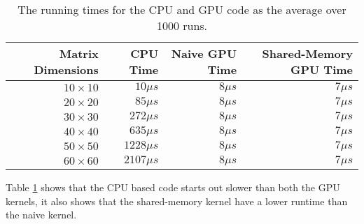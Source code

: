 \begin{table}
    \begin{tabular}{|r|r|r|r|}
        \hline
        \textbf{Matrix Dimensions} & \textbf{CPU Time} & \textbf{Naive GPU Time} & \textbf{Shared-Memory GPU Time}\\\hline
        $10 \times  10$ & $  10\mu s$ & $8\mu s$ & $7\mu s$ \\
        $20 \times  20$ & $  85\mu s$ & $8\mu s$ & $7\mu s$ \\
        $30 \times  30$ & $ 272\mu s$ & $8\mu s$ & $7\mu s$ \\
        $40 \times  40$ & $ 635\mu s$ & $8\mu s$ & $7\mu s$ \\
        $50 \times  50$ & $1228\mu s$ & $8\mu s$ & $7\mu s$ \\
        $60 \times  60$ & $2107\mu s$ & $8\mu s$ & $7\mu s$ \\\hline

    \end{tabular}
    \caption{The running times for the CPU and GPU code as the average over 1000
    runs.}
    \label{tab:task3time}
\end{table}

Table \ref{tab:task3time} shows that the CPU based code starts out slower than
both the GPU kernels, it also shows that the shared-memory kernel have a lower
runtime than the naive kernel.
